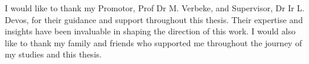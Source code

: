 I would like to thank my Promotor, Prof Dr M. Verbeke, and Supervisor, Dr Ir L. Devos, for their guidance and support throughout this thesis.
Their expertise and insights have been invaluable in shaping the direction of this work.
I would also like to thank my family and friends who supported me throughout the journey of my studies and this thesis.